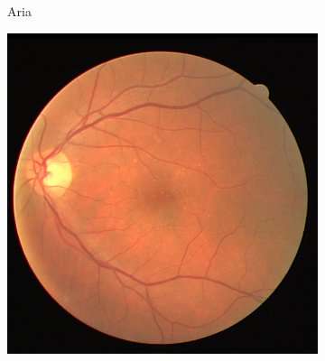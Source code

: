 \begin{figure}[H]
\begin{subfigure}[b]{0.1\textwidth}
        \caption{Aria}
        \label{fig:Aria}
    \end{subfigure}
    \begin{subfigure}[b]{0.1\textwidth}
				\centering
        \includegraphics[height=2\textwidth]{./Figures/imagesDRIVE.png}\hspace{10mm}

\end{subfigure}
\end{figure}
